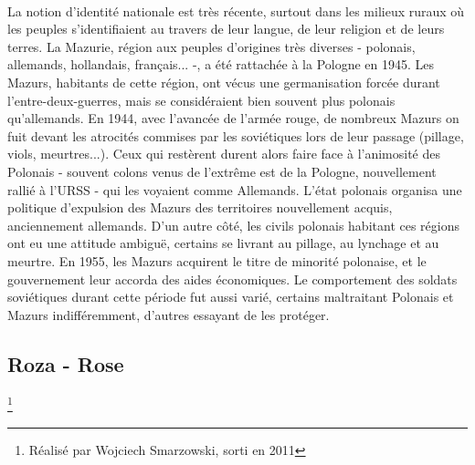 \documentclass[12pt, twocolumn]{amsart}
\begin{document}
\paragraph{}
La notion d'identité nationale est très récente, surtout dans les milieux ruraux où les peuples s'identifiaient au travers de leur langue, de leur religion et de leurs terres. La Mazurie, région aux peuples d'origines très diverses - polonais, allemands, hollandais, français... -, a été rattachée à la Pologne en 1945. Les Mazurs, habitants de cette région, ont vécus une germanisation forcée durant l'entre-deux-guerres, mais se considéraient bien souvent plus polonais qu'allemands. En 1944, avec l'avancée de l'armée rouge, de nombreux Mazurs on fuit devant les atrocités commises par les soviétiques lors de leur passage (pillage, viols, meurtres...). Ceux qui restèrent durent alors faire face à l'animosité des Polonais - souvent colons venus de l'extrême est de la Pologne, nouvellement rallié à l'URSS - qui les voyaient comme Allemands. L'état polonais organisa une politique d'expulsion des Mazurs des territoires nouvellement acquis, anciennement allemands. D'un autre côté, les civils polonais habitant ces régions ont eu une attitude ambiguë, certains se livrant au pillage, au lynchage et au meurtre. En 1955, les Mazurs acquirent le titre de minorité polonaise, et le gouvernement leur accorda des aides économiques. Le comportement des soldats soviétiques durant cette période fut aussi varié, certains maltraitant Polonais et Mazurs indifféremment, d'autres essayant de les protéger.
\subsection*{Roza - Rose}\footnote{Réalisé par Wojciech Smarzowski, sorti en 2011}
\end{document}
